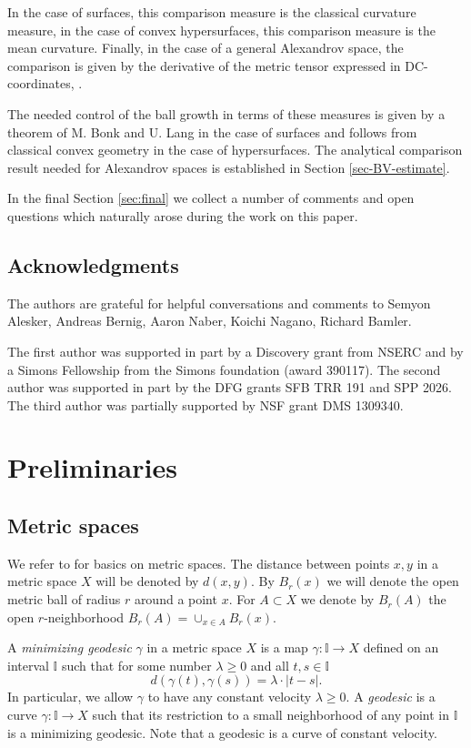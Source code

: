 \documentclass[12pt,leqno,intlimits]{amsart}
\numberwithin{equation}{section}
\theoremstyle{definition}
\theoremstyle{remark}
\def\:{\colon}
\begin{document}
In the case of surfaces, this comparison measure is the classical curvature measure, in the case of convex hypersurfaces, this comparison measure is the mean curvature. 
Finally, in the case of a general Alexandrov space, the comparison is given by the derivative of the metric tensor expressed in DC-coordinates, \cite{Per-DC}.

The needed control of the ball growth in terms of these measures is given by a theorem of M. Bonk and U. Lang in the case of surfaces and follows from classical convex geometry in the case of hypersurfaces.
The analytical comparison result needed for Alexandrov spaces is established in Section \ref{sec-BV-estimate}.

In the final Section \ref{sec:final} we collect a number of comments and open questions which naturally arose during the work on this paper.

\subsection{Acknowledgments} The authors are grateful for helpful conversations and comments to Semyon Alesker, Andreas Bernig, Aaron Naber, Koichi Nagano, Richard Bamler.

The first author was supported in part by a Discovery grant from NSERC and by a Simons Fellowship from the Simons foundation (award 390117).
The second author was supported in part by the DFG grants SFB TRR 191 and SPP 2026.
The third author was partially supported by NSF grant DMS 1309340.

\section{Preliminaries} \label{sec:prelim}
\subsection{Metric spaces}
We refer to \cite{BBI01} for basics on metric spaces.
The distance between points $x,y$ in a metric space $X$ will be denoted by $d(x,y)$.
By $B_r(x)$ we will denote the open metric ball of radius $r$ around a point $x$. For $A\subset X$
we denote by $B_r (A)$ the open $r$-neighborhood $B_r (A) =\cup _{x\in A} B_r (x)$.

A \emph {minimizing geodesic} $\gamma$ in a metric space $X$ is a map $\gamma \: \mathbb I\to X$ defined on an interval $\mathbb I$ such that for some number $\lambda \geq 0$ and all $t,s\in \mathbb I$
$$ d(\gamma (t),\gamma (s)) =\lambda \cdot |t-s|.$$
In particular, we allow $\gamma$ to have any constant velocity $\lambda \geq 0$.
A \emph{geodesic} is a curve $\gamma\: \mathbb I\to X$ such that its restriction to a small neighborhood of any point in $\mathbb I$ is a minimizing geodesic.
Note that a geodesic is a curve of constant velocity.
\end{document}
